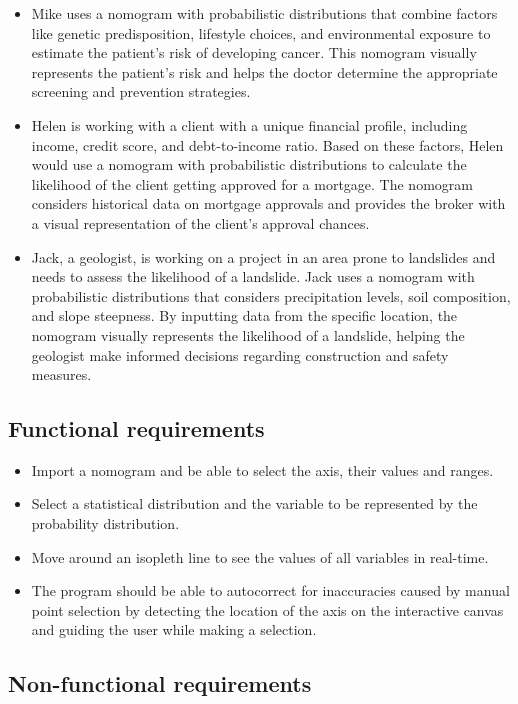 \documentclass{l4proj}
\begin{document}
\begin{itemize}
    \item Mike uses a nomogram with probabilistic distributions that combine factors like genetic predisposition, lifestyle choices, and environmental exposure to estimate the patient's risk of developing cancer. This nomogram visually represents the patient's risk and helps the doctor determine the appropriate screening and prevention strategies.
    \item Helen is working with a client with a unique financial profile, including income, credit score, and debt-to-income ratio.
    Based on these factors, Helen would use a nomogram with probabilistic distributions to calculate the likelihood of the client getting approved for a mortgage. The nomogram considers historical data on mortgage approvals and provides the broker with a visual representation of the client's approval chances. 
    \item Jack, a geologist, is working on a project in an area prone to landslides and needs to assess the likelihood of a landslide. Jack uses a nomogram with probabilistic distributions that considers precipitation levels, soil composition, and slope steepness. By inputting data from the specific location, the nomogram visually represents the likelihood of a landslide, helping the geologist make informed decisions regarding construction and safety measures.
\end{itemize}
\subsection{Functional requirements}

\begin{itemize}
    \item Import a nomogram and be able to select the axis, their values and ranges.
    \item Select a statistical distribution and the variable to be represented by the probability distribution.
    \item Move around an isopleth line to see the values of all variables in real-time.
    \item The program should be able to autocorrect for inaccuracies caused by manual point selection by detecting the location of the axis on the interactive canvas and guiding the user while making a selection. 
    
\end{itemize}
\subsection{Non-functional requirements}
\end{document}
